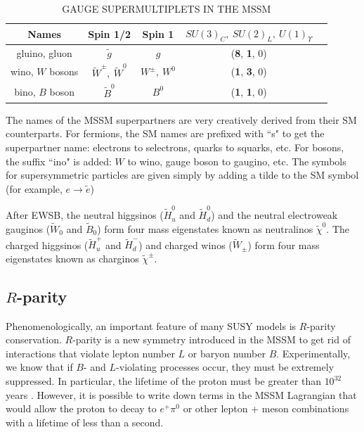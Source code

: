 \begin{table}[ht]
    \caption{GAUGE SUPERMULTIPLETS IN THE MSSM}
    \centering
    \begin{tabular}{|c|c|c|c|c|}
    \hline
    \hline
    Names & Spin 1/2 & Spin 1 &$SU(3)_C,~SU(2)_L,~U(1)_\Upsilon $\\
  	  \hline
           \hline    
gluino, gluon & $\tilde{g}$ & $g$   & (\textbf{8}, \textbf{1}, 0) \\
\hline
wino, $W$ bosons & $\widetilde{W}^\pm,~\widetilde{W}^0$ & $W^\pm,~W^0$ & (\textbf{1}, \textbf{3}, 0) \\
\hline
bino, $B$ boson & $\widetilde{B}^0$ & $B^0$ & (\textbf{1}, \textbf{1}, 0) \\
           \hline
           \hline
    \end{tabular}
    \label{tab:SUSY_bosons}
\end{table}

The names of the MSSM superpartners are very creatively derived from their SM counterparts. For fermions, the SM names are prefixed with ``s" to get the superpartner name: electrons to selectrons, quarks to squarks, etc. For bosons, the suffix ``ino" is added: $W$ to wino, gauge boson to gaugino, etc. The symbols for supersymmetric particles are given simply by adding a tilde to the SM symbol (for example, $e \rightarrow \tilde{e}$)

After EWSB, the neutral higgsinos ($\widetilde{H}_u^0$ and $\widetilde{H}_d^0$) and the neutral electroweak gauginos ($\widetilde{W}_0$ and $\widetilde{B}_0$) form four mass eigenstates known as neutralinos $\widetilde{\chi}^0$. The charged higgsinos ($\widetilde{H}_u^+$ and $\widetilde{H}_d^-$) and charged winos ($\widetilde{W}_\pm$) form four mass eigenstates known as charginos $\widetilde{\chi}^\pm$. 



\subsection{$R$-parity}
\label{sec:Rparity}
Phenomenologically, an important feature of many SUSY models is $R$-parity conservation.
$R$-parity is a new symmetry introduced in the MSSM to get rid of interactions that violate lepton number $L$
or baryon number $B$. 
Experimentally, we know that if $B$- and $L$-violating processes occur, they must be extremely suppressed. 
In particular, the lifetime of the proton must be greater than $10^{32}$ years \cite{SUSYprimer}. 
However, it is possible to write down terms in the MSSM Lagrangian that would allow the proton to decay to $e^+\pi^0$ or other 
lepton + meson combinations with a lifetime of less than a second.

